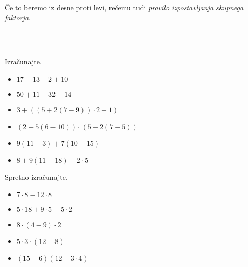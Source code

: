                     Če to beremo iz desne proti levi, rečemu tudi \textit{pravilo izpostavljanja skupnega faktorja}.
            
        ~\\~\\
                
                    \begin{naloga}
                        Izračunajte.
                        \begin{itemize}
                            \item $17-13-2+10$  
                            \item $50+11-32-14$  
                            \item $3+((5+2(7-9))\cdot 2-1)$  
                            \item $(2-5(6-10))\cdot(5-2(7-5))$  
                            \item $9(11-3)+7(10-15)$  
                            \item $8+9(11-18)-2\cdot 5$  
                        \end{itemize}
                    \end{naloga}
                
                    \begin{naloga}
                        Spretno izračunajte.
                        \begin{itemize}
                            \item $7\cdot 8-12\cdot 8$  
                            \item $5\cdot 18+9\cdot 5-5\cdot 2$  
                            \item $8\cdot(4-9)\cdot 2$  
                            \item $5\cdot 3\cdot (12-8)$  
                            \item $(15-6)(12-3\cdot 4)$  
                        \end{itemize}
                    \end{naloga}
                
